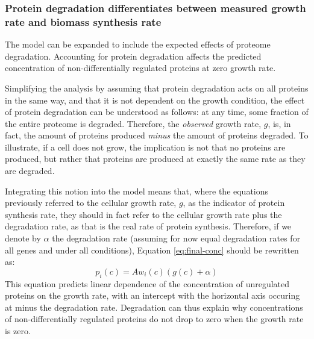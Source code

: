 \subsubsection{Protein degradation differentiates between measured growth rate and biomass synthesis rate}
The model can be expanded to include the expected effects of proteome degradation.
Accounting for protein degradation affects the predicted concentration of non-differentially regulated proteins at zero growth rate.

Simplifying the analysis by assuming that protein degradation acts on all proteins in the same way, and that it is not dependent on the growth condition, the effect of protein degradation can be understood as follows: at any time, some fraction of the entire proteome is degraded.
Therefore, the \emph{observed} growth rate, $g$, is, in fact, the amount of proteins produced \emph{minus} the amount of proteins degraded.
To illustrate, if a cell does not grow, the implication is not that no proteins are produced, but rather that proteins are produced at exactly the same rate as they are degraded.

Integrating this notion into the model means that, where the equations previously referred to the cellular growth rate, $g$, as the indicator of protein synthesis rate, they should in fact refer to the cellular growth rate plus the degradation rate, as that is the real rate of protein synthesis.
Therefore, if we denote by $\alpha$ the degradation rate (assuming for now equal degradation rates for all genes and under all conditions), Equation \ref{eq:final-conc} should be rewritten as:
\begin{equation}
  \label{eq:final-conc-deg}
  p_i(c)=Aw_i(c)(g(c)+\alpha)
\end{equation}
This equation predicts linear dependence of the concentration of unregulated proteins on the growth rate, with an intercept with the horizontal axis occuring at minus the degradation rate.
Degradation can thus explain why concentrations of non-differentially regulated proteins do not drop to zero when the growth rate is zero.